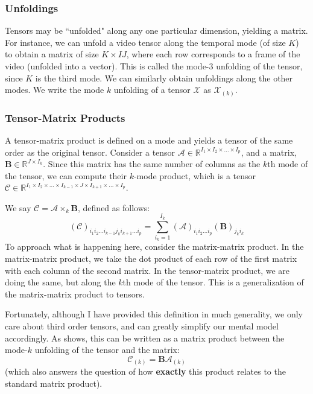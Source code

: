 \documentclass{article}
\begin{document}
\subsubsection{Unfoldings}
Tensors may be ``unfolded" along any one particular dimension, yielding a matrix. For instance, we can unfold a video tensor along the temporal mode (of size $K$) to obtain a matrix of size $K \times IJ$, where each row corresponds to a frame of the video (unfolded into a vector). This is called the mode-$3$ unfolding of the tensor, since $K$ is the third mode. We can similarly obtain unfoldings along the other modes. We write the mode $k$ unfolding of a tensor $\mathcal{X}$ as $\mathcal{X}_{(k)}$.

\subsubsection{Tensor-Matrix Products}
A tensor-matrix product is defined on a mode and yields a tensor of the same order as the original tensor. Consider a tensor $\mathcal{A} \in \mathbb{R}^{I_1\times I_2\times \dots \times I_p}$, and a matrix, $\mathbf{B} \in \mathbb{R}^{J \times I_k}$. Since this matrix has the same number of columns as the $k$th mode of the tensor, we can compute their $k$-mode product, which is a tensor $\mathcal{C} \in \mathbb{R}^{I_1\times I_2\times \dots \times I_{k-1} \times J \times I_{k+1} \times \dots \times I_p}$. 

We say $\mathcal{C} = \mathcal{A} \times_k \mathbf{B}$, defined as follows:
\begin{equation*}
	(\mathcal{C})_{i_1i_2\dots i_{k-1}j_ki_{k+1}\dots i_p} = \sum_{i_k = 1}^{I_k} (\mathcal{A})_{i_1i_2\dots i_p} (\mathbf{B})_{j_ki_k}
\end{equation*}
To approach what is happening here, consider the matrix-matrix product. In the matrix-matrix product, we take the dot product of each row of the first matrix with each column of the second matrix. In the tensor-matrix product, we are doing the same, but along the $k$th mode of the tensor. This is a generalization of the matrix-matrix product to tensors.\bigskip

Fortunately, although I have provided this definition in much generality, we only care about third order tensors, and can greatly simplify our mental model accordingly. As \cite{synthesis} shows, this can be written as a matrix product between the mode-$k$ unfolding of the tensor and the matrix:
\begin{equation*}
\mathcal{C}_{(k)} = \mathbf{B} \mathcal{A}_{(k)} 
\end{equation*}
(which also answers the question of how \textbf{exactly} this product relates to the standard matrix product).
\end{document}
